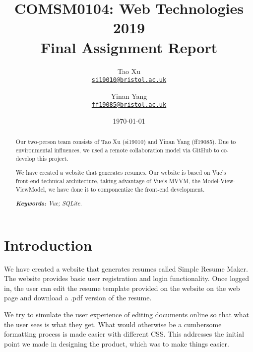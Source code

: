 \documentclass[11pt]{article}
\title{COMSM0104: Web Technologies 2019 \\Final Assignment Report}
\author{Tao Xu\\%
	\href{mailto:si19010@bristol.ac.uk}{\texttt{si19010@bristol.ac.uk}} %
	\and Yinan Yang\\%
	\href{mailto:ff19085@bristol.ac.uk}{\texttt{ff19085@bristol.ac.uk}} %
}
\date{\today}
\begin{document}
	{
		\maketitle
		\begin{abstract}
			
			Our two-person team consists of Tao Xu (si19010) and Yinan Yang (ff19085). Due to environmental influences, we used a remote collaboration model via GitHub to co-develop this project.
			
			We have created a website that generates resumes. Our website is based on Vue's front-end technical architecture, taking advantage of Vue's MVVM, the Model-View- ViewModel, we have done it to componentize the front-end development.
			
			\noindent
			\textit{\textbf{Keywords: }%
				Vue; SQLite.} \\ %
			\noindent
			
		\end{abstract}
	}
	
	
	\section{Introduction}
	
	We have created a website that generates resumes called Simple Resume Maker. The website provides basic user registration and login functionality. Once logged in, the user can edit the resume template provided on the website on the web page and download a .pdf version of the resume.
	
	We try to simulate the user experience of editing documents online so that what the user sees is what they get. What would otherwise be a cumbersome formatting process is made easier with different CSS. This addresses the initial point we made in designing the product, which was to make things easier.
	
\end{document}

